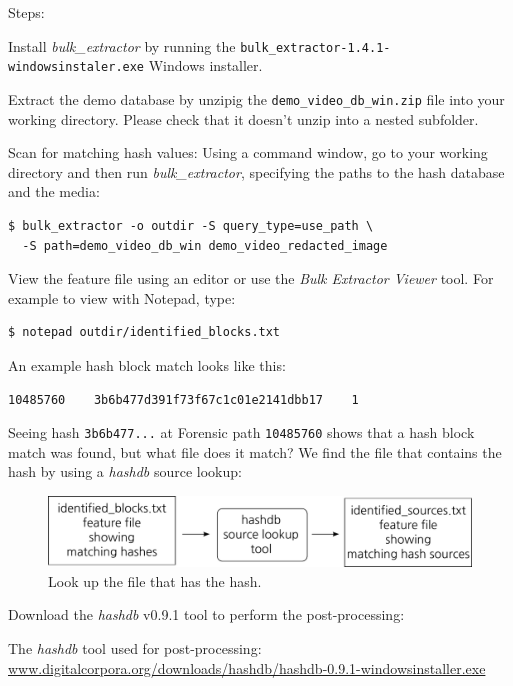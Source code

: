 \documentclass[12pt,twoside]{article}
\newcommand{\hdb}{\emph{hashdb}\xspace}
\newcommand{\bulk}{\emph{bulk\_extractor}\xspace}
\newcommand{\bev}{\emph{Bulk Extractor Viewer}\xspace}
\begin{document}
Steps:
\begin{compactenum}
\item Install \bulk by running the
\texttt{bulk\_extractor-1.4.1-windowsinstaler.exe} Windows installer.
\item Extract the demo database
by unzipig the \texttt{demo\_video\_db\_win.zip} file
into your working directory.
Please check that it doesn't unzip into a nested subfolder.
\item Scan for matching hash values: Using a command window, go to your working directory and then run \bulk,
specifying the paths to the hash database and the media:
\begin{verbatim}
$ bulk_extractor -o outdir -S query_type=use_path \
  -S path=demo_video_db_win demo_video_redacted_image
\end{verbatim}
\item View the feature file using an editor or use the \bev tool.
For example to view with Notepad, type:
\begin{verbatim}
$ notepad outdir/identified_blocks.txt
\end{verbatim}
An example hash block match looks like this:
\begin{verbatim}
10485760    3b6b477d391f73f67c1c01e2141dbb17    1
\end{verbatim}
\end{compactenum}

Seeing hash \texttt{3b6b477...} at Forensic path \texttt{10485760}
shows that a hash block match was found, but what file does it match?
We find the file that contains the hash by using a \hdb source lookup:
\begin{figure}[H]
  \center
  \includegraphics[scale=0.6]{drawings/source_lookup}
  \caption*{Look up the file that has the hash.}
  \label{fig:source_lookup}
\end{figure}

Download the \hdb v0.9.1 tool to perform the post-processing:
\begin{compactitem}
\item The \hdb tool used for post-processing:
\url{www.digitalcorpora.org/downloads/hashdb/hashdb-0.9.1-windowsinstaller.exe}
\end{compactitem}
\end{document}
